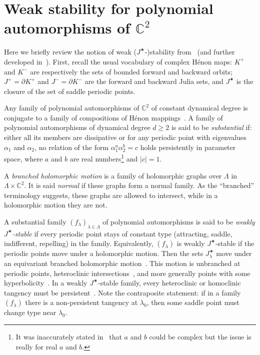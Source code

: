 \documentclass[11pt, oneside]{amsart}
\newcommand{\C}{\mathbb{C}}
\newcommand{\fr}{\partial}
\newcommand{\abs}[1]{\left\vert#1\right\vert}
\newcommand{\la}{\lambda}
\newcommand{\lo}{{\lambda_0}}
\newcommand{\La}{\Lambda}
\newcommand{\jstar}{J^\varstar}
\theoremstyle{remark}
\theoremstyle{definition}
\theoremstyle{theorem}
\begin{document}
 


\appendix

\section{Weak  stability for polynomial automorphisms of $\C^2$}

Here we briefly review  the notion of weak ($\jstar$-)stability from~\cite{tangencies} 
(and further developed in~\cite{hyperbolic}). 
First, recall the usual vocabulary of complex Hénon maps:  
$K^+$ and $K^-$ are respectively the sets of bounded forward and backward orbits; 
$J^+ = \fr K^+$ and $J^-  = \fr K^-$ are the forward and backward Julia sets, and 
   $\jstar$ is  the closure of the set of saddle periodic points. 
   
Any  family of polynomial automorphisms of $\C^2$ of constant dynamical degree
is   conjugate to a family of compositions of Hénon mappings~\cite[Prop. 2.1]{tangencies}. A family of polynomial automorphisms of dynamical degree $d\geq 2$ is said to be {\em substantial} if: 
 either all its members are dissipative or for any periodic point with eigenvalues $\alpha_1$ and $\alpha_2$, 
 no relation of the form $\alpha_1^a\alpha^b_2 = c$ holds persistently in parameter space, 
 where $a$ and  $b$  are real numbers\footnote{It was inaccurately 
 stated in~\cite{tangencies} that $a$ and $b$ could be complex but the   issue is really 
  for real $a$ and $b$.}
and $\abs{c} =1$. 

 A {\em branched holomorphic motion}  is a family of holomorphic graphs over $\La$ in $\La\times \C^2$. 
It is said  \emph{normal} if these graphs form a normal family. As the  ``branched'' terminology
suggests, these graphs are allowed to intersect, while in a holomorphic motion they are not. 
  
 A substantial family $(f_\la)_{\la\in \La}$ of 
 polynomial automorphisms is said to be  {\em weakly $\jstar$-stable} if every periodic point  stays of 
 constant type (attracting, saddle, indifferent, repelling) in the family. 
 Equivalently, $(f_\la)$ is weakly $\jstar$-stable if the periodic points 
 move under a holomorphic motion. Then the   
 sets $\jstar_\la$ move under  an equivariant  branched holomorphic motion~\cite[Thm. 4.2]{tangencies}. This motion is unbranched at periodic points, heteroclinic intersections~\cite[Prop. 4.14]{tangencies}, and more generally points with some hyperbolicity~\cite{hyperbolic}. In a weakly $\jstar$-stable family, every heteroclinic or homoclinic tangency must be persistent~\cite[Prop. 4.14]{tangencies}. Note the contraposite statement: if in  a family $(f_\la)$ there is a non-persistent tangency
 at $\lo$, then some saddle point must change type near $\lo$. 
 
\end{document}
